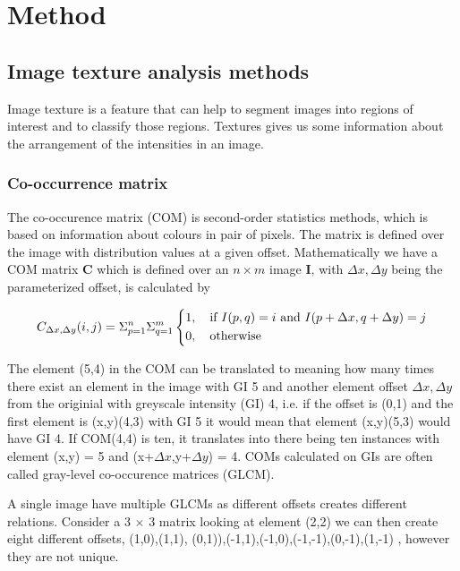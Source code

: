 \chapter{Method}


\section{Image texture analysis methods}

Image texture is a feature that can help to segment images into regions of interest and to classify those regions. Textures gives us some information about the arrangement of the intensities in an image.

\subsection{Co-occurrence matrix}


The co-occurence matrix (COM) is second-order statistics methods, which is based on information about colours in pair of pixels. The matrix is defined over the image with distribution values at a given offset. Mathematically we have a COM matrix \textbf{C} which is defined over an $n \times m$ image \textbf{I}, with $\Delta x, \Delta y$ being the parameterized offset, is calculated by

\[
C_{\Delta x, \Delta y}(i, j) = \Sigma_{p=1}^n\Sigma_{q=1}^m
\begin{dcases}
  1, \quad \text{if } I(p,q)=i \text{ and } I(p+\Delta x, q+ \Delta y) =j \\
  0, \quad \text{otherwise}
\end{dcases}
\]

The element (5,4) in the COM can be translated to meaning how many times there exist an element in the image with GI  5 and another element offset $\Delta x, \Delta y$ from the originial with greyscale intensity (GI) 4, i.e. if the offset is (0,1) and the first element is (x,y)(4,3) with GI 5 it would mean that element (x,y)(5,3) would have GI 4. If COM(4,4) is ten, it translates into there being ten instances with element (x,y) = 5 and (x+$\Delta x$,y+$\Delta y$) = 4.
COMs calculated on GIs are often called gray-level co-occurence matrices (GLCM).

A single image have multiple GLCMs as different offsets creates different relations. Consider a 3 $\times$ 3 matrix looking at element (2,2) we can then create eight different offsets, {(1,0),(1,1), (0,1)),(-1,1),(-1,0),(-1,-1),(0,-1),(1,-1)} , however they are not unique.

